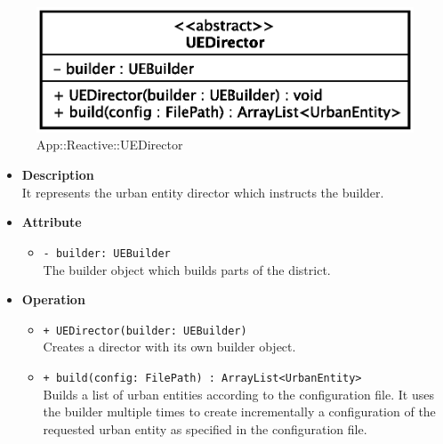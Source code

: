 \begin{figure}[h]
\centering
\includegraphics[scale=0.6,keepaspectratio]{images/solution/uedirector.eps}
\caption{App::Reactive::UEDirector}
\label{fig:sd-app-uedirector}
\end{figure}
\FloatBarrier
\begin{itemize}
  \item \textbf{Description} \\
    It represents the urban entity director which instructs the builder.
  \item \textbf{Attribute}
  \begin{itemize}
    \item \texttt{- builder: UEBuilder} \\
The builder object which builds parts of the district.
  \end{itemize}
  \item \textbf{Operation}
  \begin{itemize} 
    \item \texttt{+ UEDirector(builder: UEBuilder)} \\
Creates a director with its own builder object.
    \item \texttt{+ build(config: FilePath) : ArrayList<UrbanEntity>} \\
Builds a list of urban entities according to the configuration file. It uses the
builder multiple times to create incrementally a configuration of the requested
urban entity as specified in the configuration file.
  \end{itemize}
\end{itemize}
